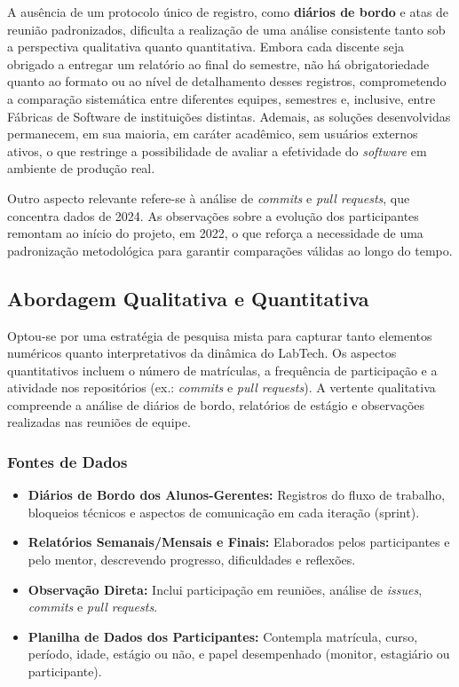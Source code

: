 \documentclass[
	12pt,           %
	openright,      %
	oneside,        %
	a4paper,        %
	brazil          %
]{abntex2}
\begin{document}
A ausência de um protocolo único de registro, como \textbf{diários de bordo} e atas de reunião padronizados, dificulta a realização de uma análise consistente tanto sob a perspectiva qualitativa quanto quantitativa. Embora cada discente seja obrigado a entregar um relatório ao final do semestre, não há obrigatoriedade quanto ao formato ou ao nível de detalhamento desses registros, comprometendo a comparação sistemática entre diferentes equipes, semestres e, inclusive, entre Fábricas de Software de instituições distintas. Ademais, as soluções desenvolvidas permanecem, em sua maioria, em caráter acadêmico, sem usuários externos ativos, o que restringe a possibilidade de avaliar a efetividade do \emph{software} em ambiente de produção real.

Outro aspecto relevante refere-se à análise de \emph{commits} e \emph{pull requests}, que concentra dados de 2024. As observações sobre a evolução dos participantes remontam ao início do projeto, em 2022, o que reforça a necessidade de uma padronização metodológica para garantir comparações válidas ao longo do tempo.

\subsection{Abordagem Qualitativa e Quantitativa}

Optou-se por uma estratégia de pesquisa mista para capturar tanto elementos numéricos quanto interpretativos da dinâmica do LabTech. Os aspectos quantitativos incluem o número de matrículas, a frequência de participação e a atividade nos repositórios (ex.: \emph{commits} e \emph{pull requests}). A vertente qualitativa compreende a análise de diários de bordo, relatórios de estágio e observações realizadas nas reuniões de equipe.

\subsubsection{Fontes de Dados}
\begin{itemize}
    \item \textbf{Diários de Bordo dos Alunos-Gerentes:} Registros do fluxo de trabalho, bloqueios técnicos e aspectos de comunicação em cada iteração (sprint).
    \item \textbf{Relatórios Semanais/Mensais e Finais:} Elaborados pelos participantes e pelo mentor, descrevendo progresso, dificuldades e reflexões.
    \item \textbf{Observação Direta:} Inclui participação em reuniões, análise de \emph{issues}, \emph{commits} e \emph{pull requests}.
    \item \textbf{Planilha de Dados dos Participantes:} Contempla matrícula, curso, período, idade, estágio ou não, e papel desempenhado (monitor, estagiário ou participante).
\end{itemize}
\end{document}

